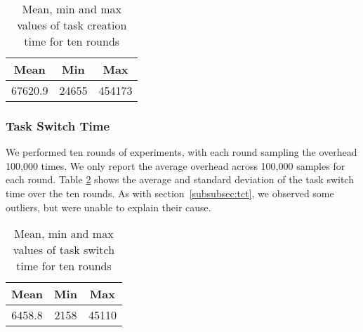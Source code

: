 \begin{table}[htb]

    \caption{Mean, min and max values of task creation time for ten rounds}
\begin{tabular}{|c|c|c|} 
    \hline
    Mean & Min & Max \\ 
    \hline
    67620.9 & 24655 & 454173 \\ 
    \hline
   \end{tabular}
    \label{tab:t4}
\end{table}

\subsubsection{Task Switch Time}
We performed ten rounds of experiments, with each round sampling the
overhead 100,000 times. %
We only report the average overhead across 100,000 samples for each
round. %
Table \ref{tab:t5} shows the average and standard deviation of the
task switch time over the ten rounds. %
As with section~\ref{subsubsec:tct}, we observed some outliers, but
were unable to explain their cause.

\begin{table}[htb]

    \caption{Mean, min and max values of task switch time for ten rounds}
 
\begin{tabular}{|c|c|c|} 
    \hline
    Mean & Min & Max \\ 
    \hline
    6458.8 & 2158 & 45110 \\ 
    \hline
   \end{tabular}
    \label{tab:t5}
\end{table}
